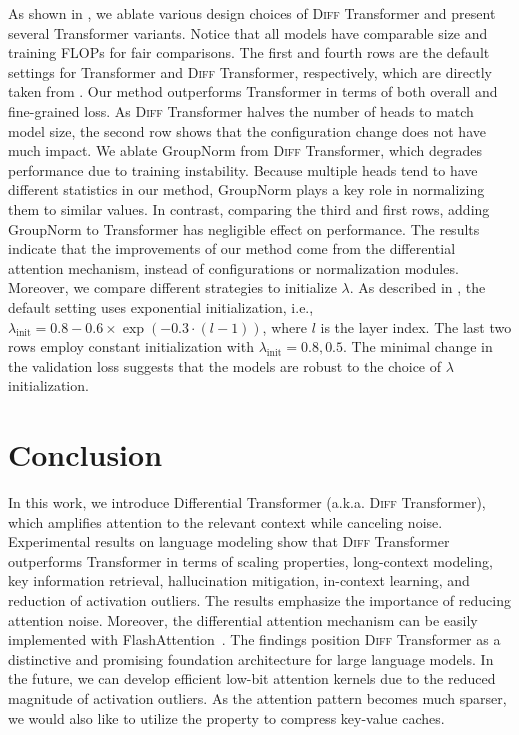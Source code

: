 \documentclass{article}
\newcommand\our{Differential Transformer}
\newcommand\ourattn{differential attention}
\newcommand\diff{\textsc{Diff} Transformer}
\newcommand\trm{Transformer}
\begin{document}
As shown in , we ablate various design choices of \diff{} and present several Transformer variants.
Notice that all models have comparable size and training FLOPs for fair comparisons.
The first and fourth rows are the default settings for \trm{} and \diff{}, respectively, which are directly taken from .
Our method outperforms \trm{} in terms of both overall and fine-grained loss.
As \diff{} halves the number of heads to match model size, the second row shows that the configuration change does not have much impact.
We ablate GroupNorm from \diff{}, which degrades performance due to training instability. Because multiple heads tend to have different statistics in our method, GroupNorm plays a key role in normalizing them to similar values.
In contrast, comparing the third and first rows, adding GroupNorm to \trm{} has negligible effect on performance.
The results indicate that the improvements of our method come from the \ourattn{} mechanism, instead of configurations or normalization modules.
Moreover, we compare different strategies to initialize $\lambda$.
As described in , the default setting uses exponential initialization, i.e., $\lambda_{\text{init}} = 0.8 - 0.6 \times \exp(-0.3 \cdot (l-1))$, where $l$ is the layer index.
The last two rows employ constant initialization with $\lambda_{\text{init}} = 0.8, 0.5$.
The minimal change in the validation loss suggests that the models are robust to the choice of $\lambda$ initialization.


\section{Conclusion}

In this work, we introduce \our{} (a.k.a. \diff{}), which amplifies attention to the relevant context while canceling noise.
Experimental results on language modeling show that \diff{} outperforms Transformer in terms of scaling properties, long-context modeling, key information retrieval, hallucination mitigation, in-context learning, and reduction of activation outliers.
The results emphasize the importance of reducing attention noise.
Moreover, the differential attention mechanism can be easily implemented with FlashAttention~\citep{fa}.
The findings position \diff{} as a distinctive and promising foundation architecture for large language models.
In the future, we can develop efficient low-bit attention kernels due to the reduced magnitude of activation outliers.
As the attention pattern becomes much sparser, we would also like to utilize the property to compress key-value caches.
\end{document}
